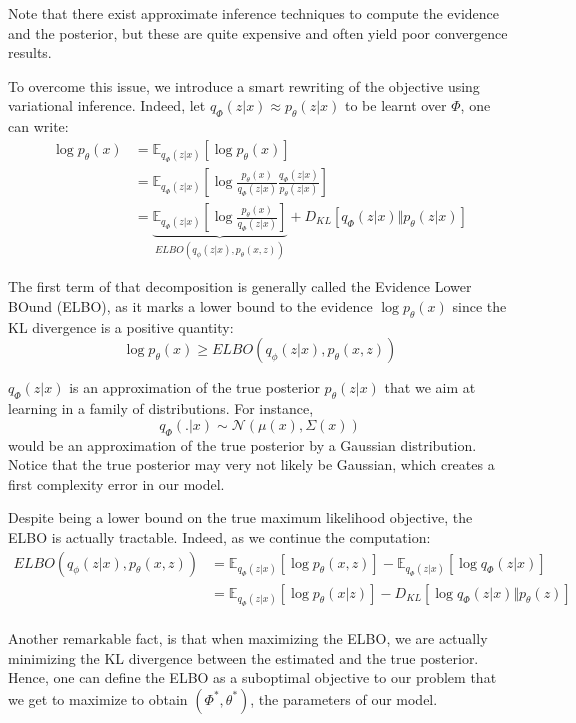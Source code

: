 Note that there exist approximate inference techniques to compute the evidence and the
posterior, but these are quite expensive and often yield poor convergence results.

To overcome this issue, we introduce a smart rewriting of the objective using variational
inference.
Indeed, let $q_{\Phi}(z|x) \approx p_{\theta}(z|x)$ to be learnt over $\Phi$, one can write:
$$
\begin{align}
    \log p_{\theta}(x) &= \mathbb{E}_{q_{\Phi}(z|x)}[\log p_{\theta}(x)] \\
    &= \mathbb{E}_{q_{\Phi}(z|x)}\left[\log \frac{p_{\theta}(x)}{q_{\Phi}(z|x)} \frac{q_{\Phi}(z|x)}{p_{\theta}(z|x)}\right]
    \\
    &= \underbrace{\mathbb{E}_{q_{\Phi}(z|x)} \left[\log \frac{p_{\theta}(x)}{q_{\Phi}(z|x)}\right]}_{ELBO(q_\phi(z|x), p_{\theta}(x,z))} + D_{KL}\left[q_{\Phi}(z|x) \Vert p_{\theta}(z|x)\right]
\end{align}
$$

The first term of that decomposition is generally called the Evidence Lower BOund (ELBO),
as it marks a lower bound to the evidence $\log p_{\theta}(x)$ since the KL divergence is a
positive quantity:
$$
\log p_{\theta}(x) \ge ELBO(q_\phi(z|x), p_{\theta}(x,z))
$$

$q_{\Phi}(z|x)$ is an approximation of the true posterior $p_{\theta}(z|x)$ that we aim at
learning in a family of distributions. For instance,
$$
q_{\Phi}(.|x) \sim \mathcal{N}(\mu(x), \Sigma(x))
$$ 
would be an approximation of the true posterior by a Gaussian distribution.
Notice that the true posterior may very not likely be Gaussian, which creates a first
complexity error in our model.

Despite being a lower bound on the true maximum likelihood objective, the ELBO is actually tractable. Indeed, as we continue the computation:
$$
\begin{align}
    ELBO(q_\phi(z|x), p_{\theta}(x,z)) &= \mathbb{E}_{q_{\Phi}(z|x)}[\log p_{\theta}(x,z)] - \mathbb{E}_{q_{\Phi}(z|x)}[\log q_{\Phi}(z|x)] \\
    &= 
\mathbb{E}_{q_{\Phi}(z|x)}[\log p_{\theta}(x|z)] - D_{KL}[\log q_{\Phi}(z|x) \Vert p_{\theta}(z)] \\\end{align}
$$

Another remarkable fact, is that when maximizing the ELBO, we are actually minimizing the KL divergence between the estimated and the true posterior.
Hence, one can define the ELBO as a suboptimal objective to our problem that we get to maximize to obtain $(\Phi^*, \theta^*)$, the parameters of our model.

